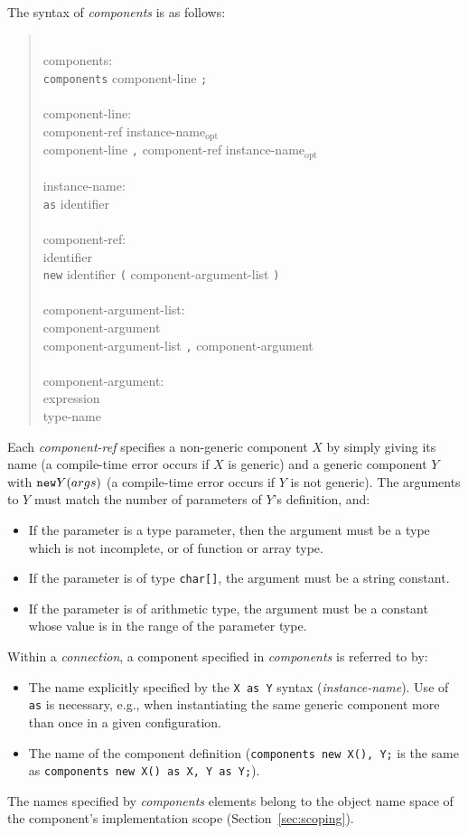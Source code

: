 \documentclass[11pt,letterpaper]{article}
\newcommand{\kw}[1]{{\tt #1}}
\newcommand{\code}[1]{{\tt #1}}
\newcommand{\opt}{$_{\mbox{opt}}$\xspace}
\newcommand{\grammarshift}{\vspace*{-.7cm}}
\newcommand{\grammarindent}{\hspace*{2cm}\= \\ \kill}
\begin{document}
The syntax of \emph{components} is as follows:
\begin{quote} \grammarshift \em \begin{tabbing}
\grammarindent
components:\\
\>	\kw{components} component-line \kw{;}\\
\\
component-line:\\
\>	component-ref instance-name\opt\\
\>	component-line \kw{,} component-ref instance-name\opt\\
\\
instance-name:\\
\>	\kw{as} identifier\\
\\
component-ref:\\
\>	identifier\\
\>	\kw{new} identifier \kw{(} component-argument-list \kw{)}\\
\\
component-argument-list:\\
\>	component-argument\\
\>	component-argument-list \kw{,} component-argument\\
\\
component-argument:\\
\>	expression\\
\>	type-name
\end{tabbing} \end{quote}
Each \emph{component-ref} specifies a non-generic component $X$ by simply
giving its name (a compile-time error occurs if $X$ is generic) and
a generic component $Y$ with $\kw{new} Y(args)$ (a compile-time error occurs
if $Y$ is not generic). The arguments to $Y$ must match the number of
parameters of $Y$'s definition, and:
\begin{itemize}
\item If the parameter is a type parameter, then the argument must be
a type which is not incomplete, or of function or array type.
\item If the parameter is of type \code{char[]}, the argument must be
a string constant.
\item If the parameter is of arithmetic type, the argument must be a 
constant whose value is in the range of the parameter type.
\end{itemize}

Within a \emph{connection}, a component specified in 
\emph{components} is referred to by:
\begin{itemize}
\item The name explicitly specified by the \code{X as Y} syntax
(\emph{instance-name}). Use of \kw{as} is necessary, e.g., when
instantiating the same generic component more than once in a given
configuration.
\item The name of the component definition (\code{components new X(), Y;} is
the same as \code{components new X() as X, Y as Y;}).
\end{itemize}
The names specified by \emph{components} elements belong to the object name
space of the component's implementation scope (Section~\ref{sec:scoping}).
\end{document}
